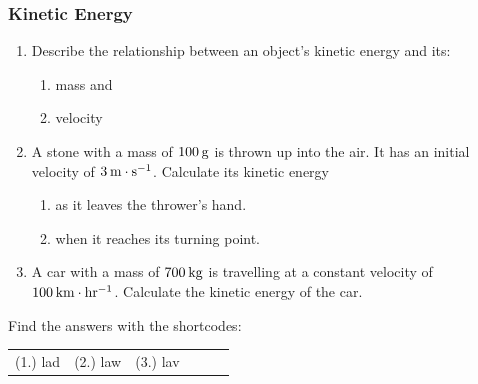             \subsubsection{  Kinetic Energy }
            \nopagebreak
        \label{m38785*id68123}\begin{enumerate}[noitemsep, label=\textbf{\arabic*}. ] 
            \label{m38785*uid69}\item Describe the relationship between an object's kinetic energy and its:
\label{m38785*id68139}\begin{enumerate}[noitemsep, label=\textbf{\alph*}. ] 
            \label{m38785*uid70}\item mass and
\label{m38785*uid71}\item velocity
\end{enumerate}
                \label{m38785*uid72}\item A stone with a mass of $100\phantom{\rule{2pt}{0ex}}\mathrm{g}$ is thrown up into the air. It has an initial velocity of $3\phantom{\rule{2pt}{0ex}}\mathrm{m}\ensuremath{\cdot}\mathrm{s}{}^{-1}$. Calculate its kinetic energy
\label{m38785*id68206}\begin{enumerate}[noitemsep, label=\textbf{\alph*}. ] 
            \label{m38785*uid73}\item as it leaves the thrower's hand.
\label{m38785*uid74}\item when it reaches its turning point.
\end{enumerate}
                \label{m38785*uid75}\item A car with a mass of $700\phantom{\rule{2pt}{0ex}}\mathrm{kg}$ is travelling at a constant velocity of $100\phantom{\rule{2pt}{0ex}}\mathrm{km}\ensuremath{\cdot}\mathrm{hr}{}^{-1}$. Calculate the kinetic energy of the car.\newline
\end{enumerate}
  \label{m38785**end}
\par {} Find the answers with the shortcodes:
 \par \begin{tabular}[h]{cccccc}
 (1.) lad  &  (2.) law  &  (3.) lav  & \end{tabular}
